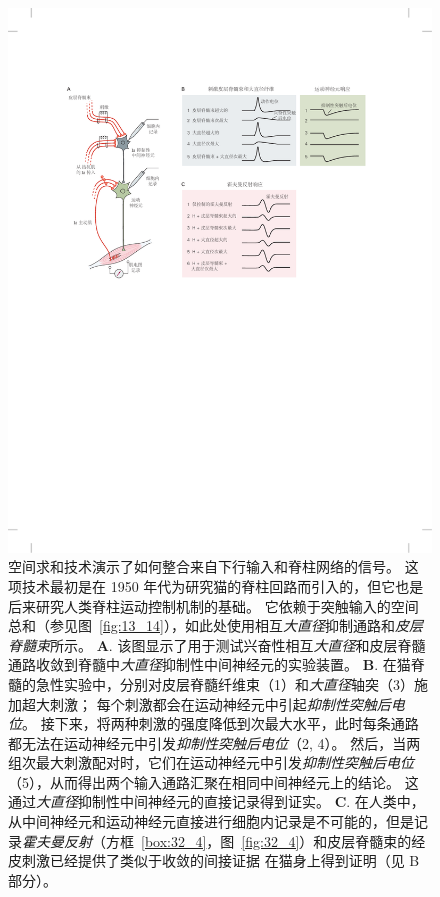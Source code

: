 \begin{figure}[htbp]
	\centering
	\includegraphics[width=1.0\linewidth]{chap32/fig_32_9}
	\caption{空间求和技术演示了如何整合来自下行输入和脊柱网络的信号。
	这项技术最初是在 1950 年代为研究猫的脊柱回路而引入的，但它也是后来研究人类脊柱运动控制机制的基础。
	它依赖于突触输入的空间总和（参见图~\ref{fig:13_14}），如此处使用相互\textit{大直径}抑制通路和\textit{皮层脊髓束}所示。
	\textbf{A}. 该图显示了用于测试兴奋性相互\textit{大直径}和皮层脊髓通路收敛到脊髓中\textit{大直径}抑制性中间神经元的实验装置。
	\textbf{B}. 在猫脊髓的急性实验中，分别对皮层脊髓纤维束（1）和\textit{大直径}轴突（3）施加超大刺激；
	每个刺激都会在运动神经元中引起\textit{抑制性突触后电位}。
	接下来，将两种刺激的强度降低到次最大水平，此时每条通路都无法在运动神经元中引发\textit{抑制性突触后电位}（2, 4）。
	然后，当两组次最大刺激配对时，它们在运动神经元中引发\textit{抑制性突触后电位}（5），从而得出两个输入通路汇聚在相同中间神经元上的结论。
	这通过\textit{大直径}抑制性中间神经元的直接记录得到证实。
	\textbf{C}. 在人类中，从中间神经元和运动神经元直接进行细胞内记录是不可能的，但是记录\textit{霍夫曼反射}（方框~\ref{box:32_4}，图~\ref{fig:32_4}）和皮层脊髓束的经皮刺激已经提供了类似于收敛的间接证据 在猫身上得到证明（见 B 部分）。
}
\end{figure}
